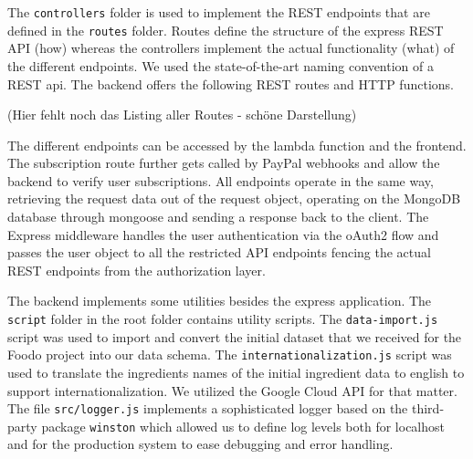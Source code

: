 The \texttt{controllers} folder is used to implement the REST endpoints that are defined in the \texttt{routes} folder. Routes define the structure of the express REST API (how) whereas the controllers implement the actual functionality (what) of the different endpoints. We used the state-of-the-art naming convention of a REST api. The backend offers the following REST routes and HTTP functions.

(Hier fehlt noch das Listing aller Routes - schöne Darstellung)

The different endpoints can be accessed by the lambda function and the frontend. The subscription route further gets called by PayPal webhooks and allow the backend to verify user subscriptions. All endpoints operate in the same way, retrieving the request data out of the request object, operating on the MongoDB database through mongoose and sending a response back to the client. The Express middleware handles the user authentication via the oAuth2 flow and passes the user object to all the restricted API endpoints fencing the actual REST endpoints from the authorization layer. 


The backend implements some utilities besides the express application. The \texttt{script} folder in the root folder contains utility scripts. The \texttt{data-import.js} script was used to import and convert the initial dataset that we received for the Foodo project into our data schema. The \texttt{internationalization.js} script was used to translate the ingredients names of the initial ingredient data to english to support internationalization. We utilized the Google Cloud API for that matter. The file \texttt{src/logger.js} implements a sophisticated logger based on the third-party package \texttt{winston} which allowed us to define log levels both for localhost and for the production system to ease debugging and error handling. 

